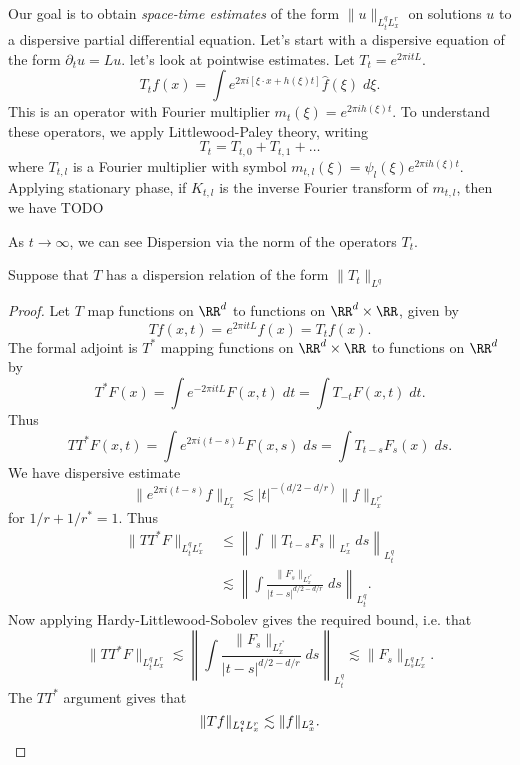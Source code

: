 Our goal is to obtain \emph{space-time estimates} of the form $\| u \|_{L^q_t L^r_x}$ on solutions $u$ to a dispersive partial differential equation. Let's start with a dispersive equation of the form $\partial_t u = Lu$. let's look at pointwise estimates. Let $T_t = e^{2 \pi i t L}$.
%
\[ T_t f(x) = \int e^{2 \pi i [\xi \cdot x + h(\xi) t]} \widehat{f}(\xi)\; d\xi. \]
%
This is an operator with Fourier multiplier $m_t(\xi) = e^{2 \pi i h(\xi) t}$. To understand these operators, we apply Littlewood-Paley theory, writing
%
\[ T_t = T_{t,0} + T_{t,1} + \dots \]
%
where $T_{t,l}$ is a Fourier multiplier with symbol $m_{t,l}(\xi) = \psi_l(\xi) e^{2 \pi i h(\xi) t}$. Applying stationary phase, if $K_{t,l}$ is the inverse Fourier transform of $m_{t,l}$, then we have TODO

As $t \to \infty$, we can see Dispersion via the norm of the operators $T_t$.

\begin{theorem}
	Suppose that $T$ has a dispersion relation of the form $\| T_t \|_{L^q}$
\end{theorem}
\begin{proof}
	Let $T$ map functions on $\RR^d$ to functions on $\RR^d \times \RR$, given by
	\[ Tf(x,t) = e^{2 \pi i t L} f(x) = T_t f(x). \]
	The formal adjoint is $T^*$ mapping functions on $\RR^d \times \RR$ to functions on $\RR^d$ by
	\[ T^*F(x) = \int e^{-2 \pi i t L} F(x,t)\; dt = \int T_{-t} F(x,t)\; dt. \]
	Thus
	\[ TT^*F(x,t) = \int e^{2 \pi i (t - s) L} F(x,s)\; ds = \int T_{t-s} F_s(x)\; ds. \]
	We have dispersive estimate
	\[ \| e^{2 \pi i (t - s)} f \|_{L^r_x} \lesssim |t|^{- (d/2 - d/r)} \| f \|_{L^{r^*}_x} \]
	for $1/r + 1/r^* = 1$. Thus
	\begin{align*}
		\| TT^* F \|_{L^q_t L^r_x} &\leq \left\| \int \left\| T_{t-s} F_s \right\|_{L^r_x}\; ds \right\|_{L^q_t}\\
		&\lesssim \left\| \int \frac{\| F_s \|_{L^{r^*}_x}}{|t - s|^{d/2 - d/r}} \; ds \right\|_{L^q_t}.
	\end{align*}
	Now applying Hardy-Littlewood-Sobolev gives the required bound, i.e. that
	\[ \| TT^* F \|_{L^q_t L^r_x} \lesssim \left\| \int \frac{\| F_s \|_{L^{r^*}_x}}{|t - s|^{d/2 - d/r}} \; ds \right\|_{L^q_t} \lesssim \| F_s \|_{L^q_s L^r_x}. \]
	The $TT^*$ argument gives that
	\[ \| Tf \|_{L^q_t L^r_x} \lesssim \| f \|_{L^2_x}. \qedhere \]
\end{proof}







